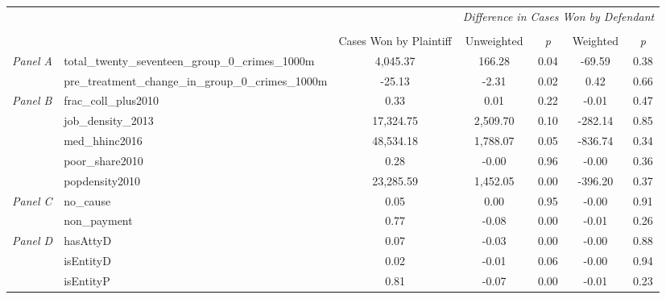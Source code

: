 \begin{tabular}{llccccc}
\toprule
 &  & \textit{} & \multicolumn{4}{c}{\textit{Difference in Cases Won by Defendant}} \\
\cline{4-7}
\\
 &  & Cases Won by Plaintiff & Unweighted & \emph{p} & Weighted & \emph{p} \\
\midrule
\multirow[c]{2}{3cm}{\textit{Panel A}} & total_twenty_seventeen_group_0_crimes_1000m & 4,045.37 & 166.28 & 0.04 & -69.59 & 0.38 \\
 & pre_treatment_change_in_group_0_crimes_1000m & -25.13 & -2.31 & 0.02 & 0.42 & 0.66 \\
\cline{1-7}
\multirow[c]{5}{3cm}{\textit{Panel B}} & frac_coll_plus2010 & 0.33 & 0.01 & 0.22 & -0.01 & 0.47 \\
 & job_density_2013 & 17,324.75 & 2,509.70 & 0.10 & -282.14 & 0.85 \\
 & med_hhinc2016 & 48,534.18 & 1,788.07 & 0.05 & -836.74 & 0.34 \\
 & poor_share2010 & 0.28 & -0.00 & 0.96 & -0.00 & 0.36 \\
 & popdensity2010 & 23,285.59 & 1,452.05 & 0.00 & -396.20 & 0.37 \\
\cline{1-7}
\multirow[c]{2}{3cm}{\textit{Panel C}} & no_cause & 0.05 & 0.00 & 0.95 & -0.00 & 0.91 \\
 & non_payment & 0.77 & -0.08 & 0.00 & -0.01 & 0.26 \\
\cline{1-7}
\multirow[c]{3}{3cm}{\textit{Panel D}} & hasAttyD & 0.07 & -0.03 & 0.00 & -0.00 & 0.88 \\
 & isEntityD & 0.02 & -0.01 & 0.06 & -0.00 & 0.94 \\
 & isEntityP & 0.81 & -0.07 & 0.00 & -0.01 & 0.23 \\
\cline{1-7}
\bottomrule
\end{tabular}

